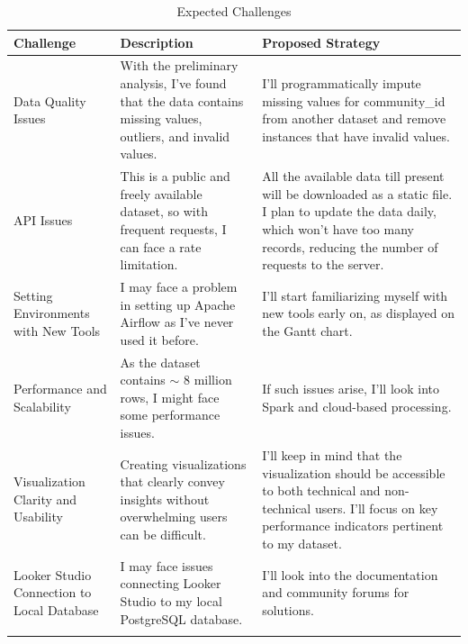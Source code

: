 \documentclass{article}
\begin{document}
\begin{longtable}{|L{3cm}|L{6cm}|L{6cm}|}
    \hline
    \textbf{Challenge} & \textbf{Description} & \textbf{Proposed Strategy} \\
    \hline
    \endfirsthead

    Data Quality Issues & With the preliminary analysis, I’ve found that the data contains missing values, outliers, and invalid values. & I’ll programmatically impute missing values for community\_id from another dataset and remove instances that have invalid values. \\
    \hline
    API Issues & This is a public and freely available dataset, so with frequent requests, I can face a rate limitation. & All the available data till present will be downloaded as a static file. I plan to update the data daily, which won’t have too many records, reducing the number of requests to the server. \\
    \hline
    Setting Environments with New Tools & I may face a problem in setting up Apache Airflow as I’ve never used it before. & I’ll start familiarizing myself with new tools early on, as displayed on the Gantt chart. \\
    \hline
    Performance and Scalability & As the dataset contains $\sim$ 8 million rows, I might face some performance issues. & If such issues arise, I’ll look into Spark and cloud-based processing. \\
    \hline
    Visualization Clarity and Usability & Creating visualizations that clearly convey insights without overwhelming users can be difficult. & I’ll keep in mind that the visualization should be accessible to both technical and non-technical users. I’ll focus on key performance indicators pertinent to my dataset. \\
    \hline
    Looker Studio Connection to Local Database & I may face issues connecting Looker Studio to my local PostgreSQL database. & I’ll look into the documentation and community forums for solutions. \\
    \hline
    \caption{Expected Challenges}
    \label{tab:challenges}
\end{longtable}

\nocite{*}


\end{document}
